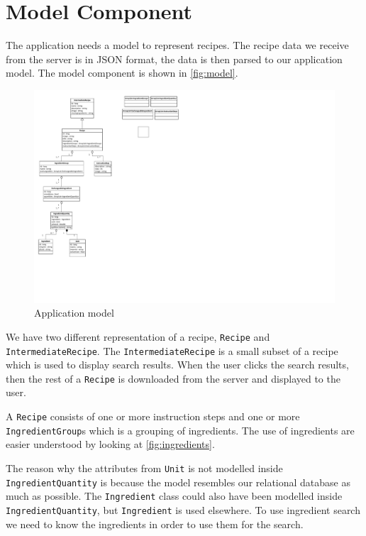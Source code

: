 \pagebreak
\section{Model Component}

The application needs a model to represent recipes. The recipe data we receive from the server is in JSON format, the data is then parsed to our application model. The model component is shown in \autoref{fig:model}.

\begin{figure}[H]
\centering
\includegraphics[width=0.67\linewidth, page=2]{img/model.pdf}
\caption{Application model}
\label{fig:model}
\end{figure}

We have two different representation of a recipe, \lstinline|Recipe| and \lstinline|IntermediateRecipe|. The \lstinline|IntermediateRecipe| is a small subset of a recipe which is used to display search results. When the user clicks the search results, then the rest of a \lstinline|Recipe| is downloaded from the server and displayed to the user.

A \lstinline|Recipe| consists of one or more instruction steps and one or more \lstinline|IngredientGroup|s which is a grouping of ingredients. The use of ingredients are easier understood by looking at \autoref{fig:ingredients}.

The reason why the attributes from \lstinline|Unit| is not modelled inside \lstinline|IngredientQuantity| is because the model resembles our relational database as much as possible. The \lstinline|Ingredient| class could also have been modelled inside \lstinline|IngredientQuantity|, but \lstinline|Ingredient| is used elsewhere. To use ingredient search we need to know the ingredients in order to use them for the search.